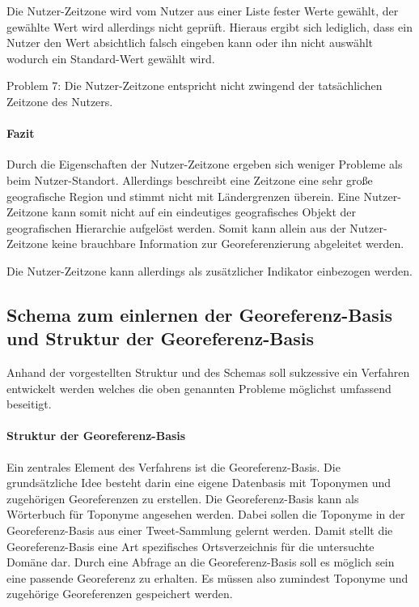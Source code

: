 				Die Nutzer-Zeitzone wird vom Nutzer aus einer Liste fester Werte gewählt, der gewählte Wert wird allerdings nicht geprüft.
				Hieraus ergibt sich lediglich, dass ein Nutzer den Wert absichtlich falsch eingeben kann oder ihn nicht auswählt wodurch ein Standard-Wert gewählt wird.

				Problem 7: Die Nutzer-Zeitzone entspricht nicht zwingend der tatsächlichen Zeitzone des Nutzers.

				\paragraph{Fazit}

				Durch die Eigenschaften der Nutzer-Zeitzone ergeben sich weniger Probleme als beim Nutzer-Standort.
				Allerdings beschreibt eine Zeitzone eine sehr große geografische Region und stimmt nicht mit Ländergrenzen überein.
				Eine Nutzer-Zeitzone kann somit nicht auf ein eindeutiges geografisches Objekt der geografischen Hierarchie aufgelöst werden.
				Somit kann allein aus der Nutzer-Zeitzone keine brauchbare Information zur Georeferenzierung abgeleitet werden. 
				
				Die Nutzer-Zeitzone kann allerdings als zusätzlicher Indikator einbezogen werden.


				\subsection{Schema zum einlernen der Georeferenz-Basis und Struktur der Georeferenz-Basis}			
					
					Anhand der vorgestellten Struktur und des Schemas soll sukzessive ein Verfahren entwickelt werden welches die oben genannten Probleme möglichst umfassend beseitigt. 


					\paragraph{Struktur der Georeferenz-Basis} 
						Ein zentrales Element des Verfahrens ist die Georeferenz-Basis.  
					 	Die grundsätzliche Idee besteht darin eine eigene Datenbasis mit Toponymen und zugehörigen Georeferenzen zu erstellen.
						Die Georeferenz-Basis kann als Wörterbuch für Toponyme angesehen werden.
						Dabei sollen die Toponyme in der Georeferenz-Basis aus einer Tweet-Sammlung gelernt werden.
						Damit stellt die Georeferenz-Basis eine Art spezifisches Ortsverzeichnis für die untersuchte Domäne dar.
						Durch eine Abfrage an die Georeferenz-Basis soll es möglich sein eine passende Georeferenz zu erhalten.
						Es müssen also zumindest Toponyme und zugehörige Georeferenzen gespeichert werden.

